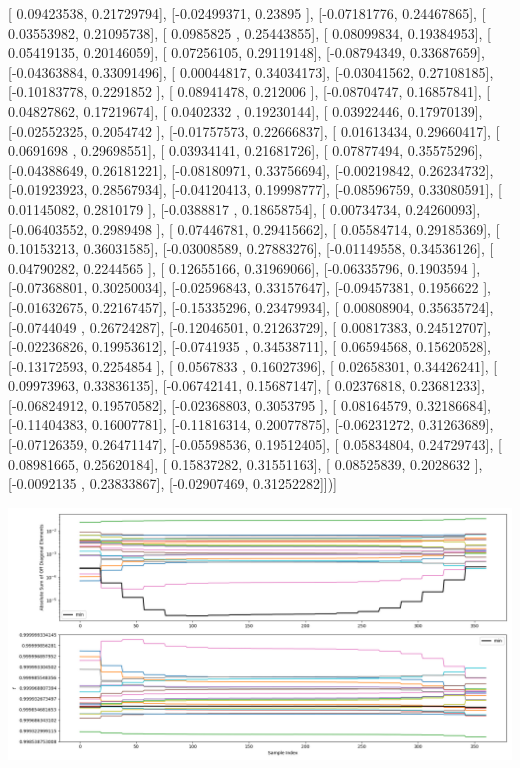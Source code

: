 \documentclass{article}
\begin{document}
       [ 0.09423538,  0.21729794],
       [-0.02499371,  0.23895   ],
       [-0.07181776,  0.24467865],
       [ 0.03553982,  0.21095738],
       [ 0.0985825 ,  0.25443855],
       [ 0.08099834,  0.19384953],
       [ 0.05419135,  0.20146059],
       [ 0.07256105,  0.29119148],
       [-0.08794349,  0.33687659],
       [-0.04363884,  0.33091496],
       [ 0.00044817,  0.34034173],
       [-0.03041562,  0.27108185],
       [-0.10183778,  0.2291852 ],
       [ 0.08941478,  0.212006  ],
       [-0.08704747,  0.16857841],
       [ 0.04827862,  0.17219674],
       [ 0.0402332 ,  0.19230144],
       [ 0.03922446,  0.17970139],
       [-0.02552325,  0.2054742 ],
       [-0.01757573,  0.22666837],
       [ 0.01613434,  0.29660417],
       [ 0.0691698 ,  0.29698551],
       [ 0.03934141,  0.21681726],
       [ 0.07877494,  0.35575296],
       [-0.04388649,  0.26181221],
       [-0.08180971,  0.33756694],
       [-0.00219842,  0.26234732],
       [-0.01923923,  0.28567934],
       [-0.04120413,  0.19998777],
       [-0.08596759,  0.33080591],
       [ 0.01145082,  0.2810179 ],
       [-0.0388817 ,  0.18658754],
       [ 0.00734734,  0.24260093],
       [-0.06403552,  0.2989498 ],
       [ 0.07446781,  0.29415662],
       [ 0.05584714,  0.29185369],
       [ 0.10153213,  0.36031585],
       [-0.03008589,  0.27883276],
       [-0.01149558,  0.34536126],
       [ 0.04790282,  0.2244565 ],
       [ 0.12655166,  0.31969066],
       [-0.06335796,  0.1903594 ],
       [-0.07368801,  0.30250034],
       [-0.02596843,  0.33157647],
       [-0.09457381,  0.1956622 ],
       [-0.01632675,  0.22167457],
       [-0.15335296,  0.23479934],
       [ 0.00808904,  0.35635724],
       [-0.0744049 ,  0.26724287],
       [-0.12046501,  0.21263729],
       [ 0.00817383,  0.24512707],
       [-0.02236826,  0.19953612],
       [-0.0741935 ,  0.34538711],
       [ 0.06594568,  0.15620528],
       [-0.13172593,  0.2254854 ],
       [ 0.0567833 ,  0.16027396],
       [ 0.02658301,  0.34426241],
       [ 0.09973963,  0.33836135],
       [-0.06742141,  0.15687147],
       [ 0.02376818,  0.23681233],
       [-0.06824912,  0.19570582],
       [-0.02368803,  0.3053795 ],
       [ 0.08164579,  0.32186684],
       [-0.11404383,  0.16007781],
       [-0.11816314,  0.20077875],
       [-0.06231272,  0.31263689],
       [-0.07126359,  0.26471147],
       [-0.05598536,  0.19512405],
       [ 0.05834804,  0.24729743],
       [ 0.08981665,  0.25620184],
       [ 0.15837282,  0.31551163],
       [ 0.08525839,  0.2028632 ],
       [-0.0092135 ,  0.23833867],
       [-0.02907469,  0.31252282]])]
\begin{center}
\includegraphics[scale=.9]{report_pickled_controls238/control_dpn_all.png}

\end{center}
\end{document}
